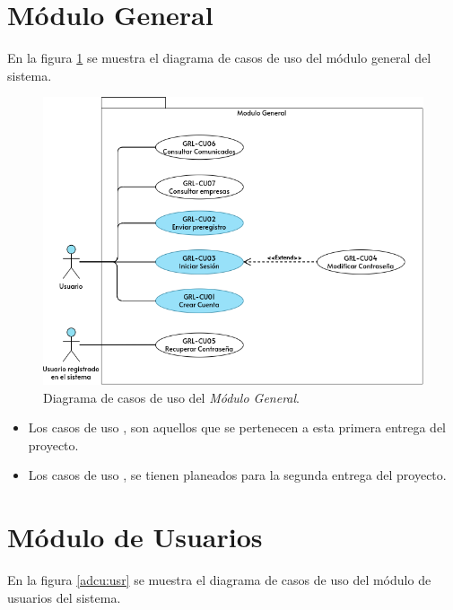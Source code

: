 \section{Módulo General}
	En la figura \ref{adcu:grl} se muestra el diagrama de casos de uso del módulo general del sistema.

	\begin{figure}[hbtp!]
		\begin{center}
			\includegraphics[width=.8\textwidth]{sprints/imagenes/CUGRL.png}
		\end{center}
		
		\caption{Diagrama de casos de uso del \textit{Módulo General}.}
		\label{adcu:grl}
	\end{figure}

	\begin{itemize}
        \item Los casos de uso \IUazul{} , son aquellos que se pertenecen a esta primera entrega del proyecto.
        \item Los casos de uso \IUblanco{}, se tienen planeados para la segunda entrega del proyecto.
    \end{itemize} 

	
	

	
	

	
	

\section{Módulo de Usuarios}
	En la figura \ref{adcu:usr} se muestra el diagrama de casos de uso del módulo de usuarios del sistema.

